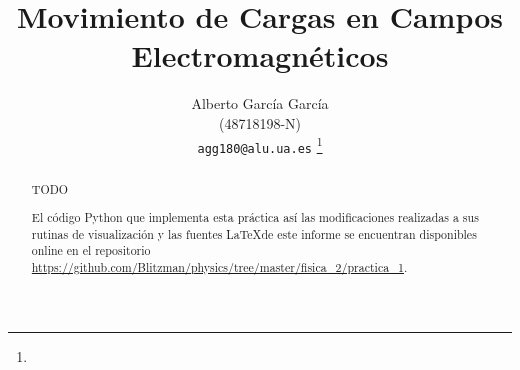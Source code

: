\documentclass[journal]{IEEEtran}
\begin{document}
%
\title{Movimiento de Cargas en Campos Electromagnéticos}
%
%
%

\author{Alberto García García\\ (48718198-N)\\ \texttt{agg180@alu.ua.es} %
\thanks{}%
}


%
{}
% 


\maketitle

\begin{abstract}
TODO

El código Python que implementa esta práctica así las modificaciones realizadas a sus rutinas de visualización y las fuentes \LaTeX de este informe se encuentran disponibles online en el repositorio \url{https://github.com/Blitzman/physics/tree/master/fisica_2/practica_1}.
\end{abstract}


%
\IEEEpeerreviewmaketitle
\end{document}
